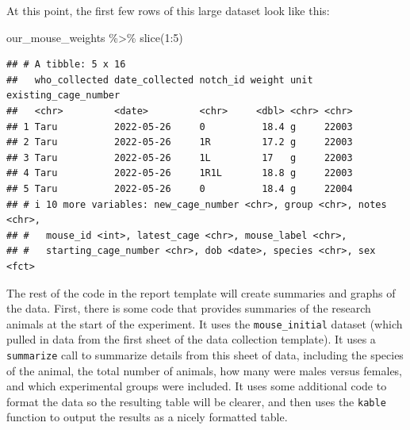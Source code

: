 \documentclass[
]{book}
\newenvironment{Shaded}{\begin{snugshade}}{\end{snugshade}}
\newcommand{\DecValTok}[1]{\textcolor[rgb]{0.00,0.00,0.81}{#1}}
\newcommand{\FunctionTok}[1]{\textcolor[rgb]{0.00,0.00,0.00}{#1}}
\newcommand{\NormalTok}[1]{#1}
\newcommand{\SpecialCharTok}[1]{\textcolor[rgb]{0.00,0.00,0.00}{#1}}
\begin{document}
At this point, the first few rows of this large dataset look like this:

\begin{Shaded}
\begin{Highlighting}[]
\NormalTok{our\_mouse\_weights }\SpecialCharTok{\%\textgreater{}\%} 
  \FunctionTok{slice}\NormalTok{(}\DecValTok{1}\SpecialCharTok{:}\DecValTok{5}\NormalTok{)}
\end{Highlighting}
\end{Shaded}

\begin{verbatim}
## # A tibble: 5 x 16
##   who_collected date_collected notch_id weight unit  existing_cage_number
##   <chr>         <date>         <chr>     <dbl> <chr> <chr>               
## 1 Taru          2022-05-26     0          18.4 g     22003               
## 2 Taru          2022-05-26     1R         17.2 g     22003               
## 3 Taru          2022-05-26     1L         17   g     22003               
## 4 Taru          2022-05-26     1R1L       18.8 g     22003               
## 5 Taru          2022-05-26     0          18.4 g     22004               
## # i 10 more variables: new_cage_number <chr>, group <chr>, notes <chr>,
## #   mouse_id <int>, latest_cage <chr>, mouse_label <chr>,
## #   starting_cage_number <chr>, dob <date>, species <chr>, sex <fct>
\end{verbatim}

The rest of the code in the report template will create summaries and graphs of the
data. First, there is some code that provides summaries of the research animals at
the start of the experiment. It uses the \texttt{mouse\_initial} dataset (which pulled
in data from the first sheet of the data collection template). It uses a
\texttt{summarize} call to summarize details from this sheet of data, including the
species of the animal, the total number of animals, how many were males versus
females, and which experimental groups were included. It uses some additional
code to format the data so the resulting table will be clearer, and then
uses the \texttt{kable} function to output the results as a nicely formatted table.
\end{document}
